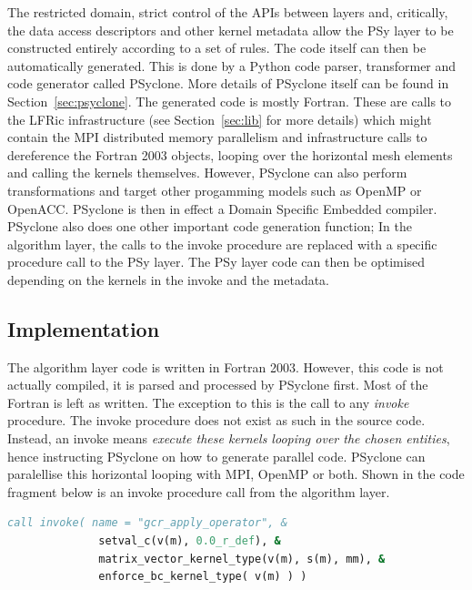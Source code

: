 \documentclass[review,times]{elsarticle}
\begin{document}
The restricted domain, strict control of the APIs between layers and,
critically, the data access descriptors and other kernel metadata
allow the PSy layer to be constructed entirely according to a set of
rules. The code itself can then be automatically generated. This is
done by a Python code parser, transformer and code generator called
PSyclone. More details of PSyclone itself can be found in
Section~\ref{sec:psyclone}. The generated code is mostly Fortran.
These are calls to the LFRic infrastructure (see Section~\ref{sec:lib} 
for more details) which might contain the
MPI distributed memory parallelism and infrastructure calls
to dereference the Fortran 2003 objects, looping over
the horizontal mesh elements and calling the kernels
themselves. However, PSyclone can also perform transformations and
target other progamming models such as OpenMP or OpenACC. PSyclone is
then in effect a Domain Specific Embedded compiler. PSyclone also does
one other important code generation function; In the algorithm layer,
the calls to the invoke procedure are replaced with a specific
procedure call to the PSy layer. The PSy layer code can then be
optimised depending on the kernels in the invoke and the metadata.

\subsection{\label{sec:sub:implement}Implementation}
The algorithm layer code is written in Fortran 2003. However, this
code is not actually compiled, it is parsed and processed by PSyclone
first. Most of the Fortran is left as written. The exception to this
is the call to any {\em invoke} procedure. The invoke procedure does not 
exist as such in the source code. Instead, an invoke means {\em execute these
kernels looping over the chosen entities}, hence instructing PSyclone on how to 
generate parallel code. PSyclone can paralellise this horizontal looping with MPI,
OpenMP or both. Shown in the code fragment below is an invoke
procedure call from the algorithm layer.

\begin{lstlisting}[language=Fortran,caption={Code fragment showing an
invoke procedure from the Algorithm layer},label={lst:invoke}]
 call invoke( name = "gcr_apply_operator", &
              setval_c(v(m), 0.0_r_def), &
              matrix_vector_kernel_type(v(m), s(m), mm), &
              enforce_bc_kernel_type( v(m) ) )
\end{lstlisting}
\end{document}

